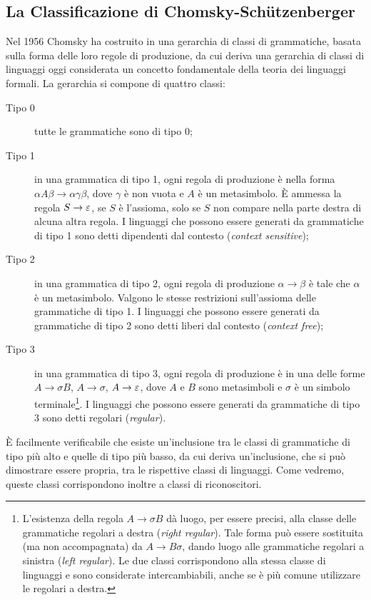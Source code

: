 \subsection{La Classificazione di Chomsky-Schützenberger}\label{subs:prel:chomshutz}
Nel 1956 Chomsky ha costruito in \cite{Chomsky:56:hier} una gerarchia di classi di grammatiche, basata sulla forma delle loro regole di produzione, da cui deriva una gerarchia di classi di linguaggi oggi considerata un concetto fondamentale della teoria dei linguaggi formali. La gerarchia si compone di quattro classi:
\begin{description}
	\item[Tipo 0] tutte le grammatiche sono di tipo 0;
	\item[Tipo 1] in una grammatica di tipo 1, ogni regola di produzione è nella forma $\alpha A\beta\to\alpha\gamma\beta$, dove $\gamma$ è non vuota e $A$ è un metasimbolo. È ammessa la regola $S\to\varepsilon$, se $S$ è l'assioma, solo se $S$ non compare nella parte destra di alcuna altra regola. I linguaggi che possono essere generati da grammatiche di tipo 1 sono detti dipendenti dal contesto (\emph{context sensitive});
	\item[Tipo 2] in una grammatica di tipo 2, ogni regola di produzione $\alpha\to\beta$ è tale che $\alpha$ è un metasimbolo. Valgono le stesse restrizioni sull'assioma delle grammatiche di tipo 1. I linguaggi che possono essere generati da grammatiche di tipo 2 sono detti liberi dal contesto (\emph{context free});
	\item[Tipo 3] in una grammatica di tipo 3, ogni regola di produzione è in una delle forme $A\to\sigma B$, $A\to\sigma$, $A\to\varepsilon$, dove $A$ e $B$ sono metasimboli e $\sigma$ è un simbolo terminale\footnote{L'esistenza della regola $A\to\sigma B$ dà luogo, per essere precisi, alla classe delle grammatiche regolari a destra (\emph{right regular}). Tale forma può essere sostituita (ma non accompagnata) da $A\to B\sigma$, dando luogo alle grammatiche regolari a sinistra (\emph{left regular}). Le due classi corrispondono alla stessa classe di linguaggi e sono considerate intercambiabili, anche se è più comune utilizzare le regolari a destra.}. I linguaggi che possono essere generati da grammatiche di tipo 3 sono detti regolari (\emph{regular}).
\end{description}
È facilmente verificabile che esiste un'inclusione tra le classi di grammatiche di tipo più alto e quelle di tipo più basso, da cui deriva un'inclusione, che si può dimostrare essere propria, tra le rispettive classi di linguaggi. Come vedremo, queste classi corrispondono inoltre a classi di riconoscitori.



